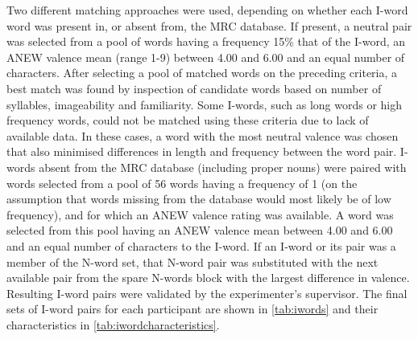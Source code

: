 \documentclass[man,floatsintext,a4paper,biblatex]{apa6}\usepackage[]{graphicx}\usepackage[]{color}
\begin{document}
Two different matching approaches were used, depending on whether each
I-word word was present in, or absent from, the MRC database.  If present,
a neutral pair was selected from a pool of words having a frequency
{\textpm}15\% that of the I-word, an ANEW valence mean (range 1-9)
between 4.00 and 6.00 and an equal number of characters.  After selecting
a pool of matched words on the preceding criteria, a best match was
found by inspection of candidate words based on number of syllables,
imageability and familiarity.  Some I-words, such as long words or high
frequency words, could not be matched using these criteria due to lack of
available data. In these cases, a word with the most neutral valence was
chosen that also minimised differences in length and frequency between
the word pair. I-words absent from the MRC database (including proper
nouns) were paired with words selected from a pool of 56 words having a
frequency of 1 (on the assumption that words missing from the database
would most likely be of low frequency), and for which an ANEW valence
rating was available.  A word was selected from this pool having an ANEW
valence mean between 4.00 and 6.00 and an equal number of characters
to the I-word. If an I-word or its pair was a member of the N-word set,
that N-word pair was substituted with the next available pair from the
spare N-words block with the largest difference in valence. Resulting
I-word pairs were validated by the experimenter's supervisor. The final
sets of I-word pairs for each participant are shown in \cref{tab:iwords}
and their characteristics in \cref{tab:iwordcharacteristics}.
\end{document}
